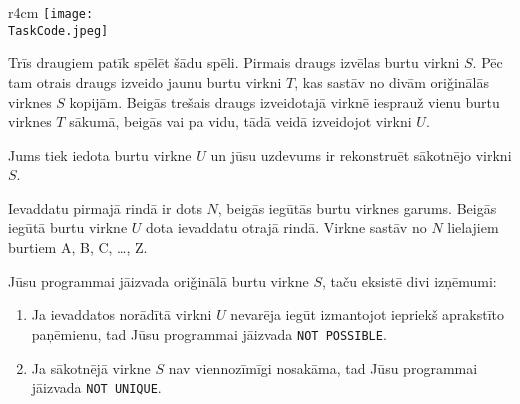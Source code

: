 \documentclass{boi2014-lv}
\renewcommand{\TaskCode}{friends}
\begin{document}
    \begin{wrapfigure}{r}{4cm}
        \vspace{-24pt}
		\texttt{[image: \\TaskCode.jpeg]}
	\end{wrapfigure}
		Trīs draugiem patīk spēlēt šādu spēli.
		Pirmais draugs izvēlas burtu virkni $S$. Pēc tam otrais draugs izveido jaunu burtu virkni $T$, kas sastāv no divām ori\v{g}inālās virknes $S$ kopijām. Beigās trešais draugs izveidotajā virknē iesprauž vienu burtu virknes $T$ sākumā, beigās vai pa vidu, tādā veidā izveidojot virkni $U$.

    \Task
    Jums tiek iedota burtu virkne $U$ un jūsu uzdevums ir rekonstruēt sākotnējo virkni $S$.

    \Input
    Ievaddatu pirmajā rindā ir dots $N$, beigās iegūtās burtu virknes garums. Beigās iegūtā burtu virkne $U$ dota ievaddatu otrajā rindā. Virkne sastāv no $N$ lielajiem burtiem A, B, C, \ldots{}, Z.

    \Output
		Jūsu programmai jāizvada ori\v{g}inālā burtu virkne $S$, taču eksistē divi izņēmumi:
    \begin{enumerate}
        \item Ja ievaddatos norādītā virkni $U$ nevarēja iegūt izmantojot iepriekš aprakstīto paņēmienu, tad Jūsu programmai jāizvada {\tt NOT POSSIBLE}.%
        \item Ja sākotnējā virkne $S$ nav viennozīmīgi nosakāma, tad Jūsu programmai jāizvada {\tt NOT UNIQUE}. %
    \end{enumerate}
    

    \Examples

\end{document}
